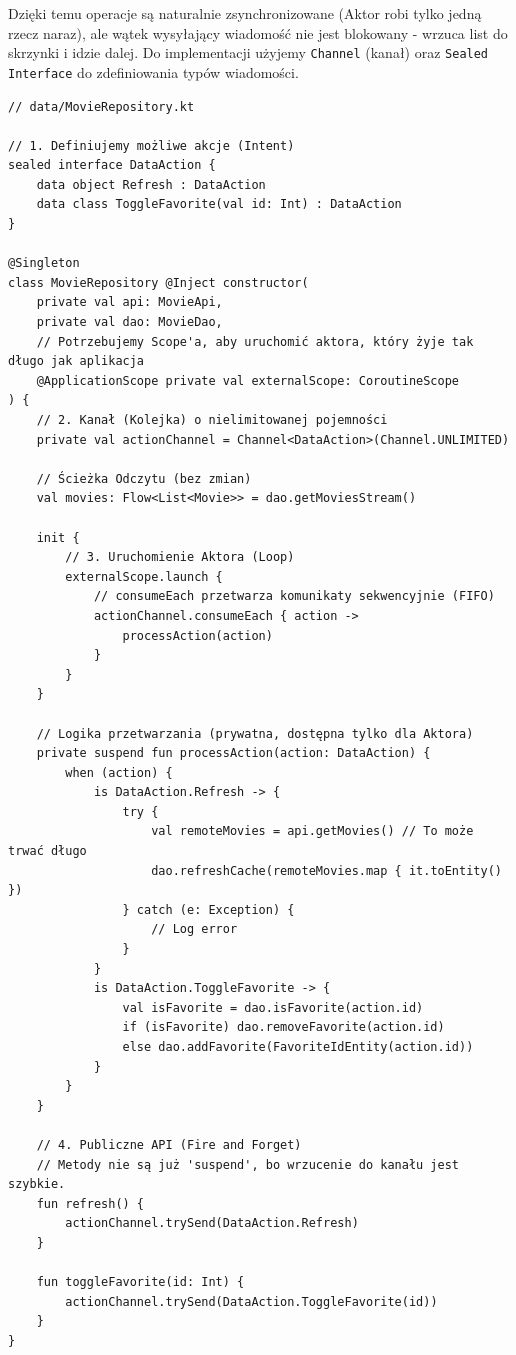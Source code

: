 Dzięki temu operacje są naturalnie zsynchronizowane (Aktor robi tylko jedną rzecz naraz), ale wątek wysyłający wiadomość nie jest blokowany - wrzuca list do skrzynki i idzie dalej. Do implementacji użyjemy \texttt{Channel} (kanał) oraz \texttt{Sealed Interface} do zdefiniowania typów wiadomości.

\begin{verbatim}
// data/MovieRepository.kt

// 1. Definiujemy możliwe akcje (Intent)
sealed interface DataAction {
    data object Refresh : DataAction
    data class ToggleFavorite(val id: Int) : DataAction
}

@Singleton
class MovieRepository @Inject constructor(
    private val api: MovieApi,
    private val dao: MovieDao,
    // Potrzebujemy Scope'a, aby uruchomić aktora, który żyje tak długo jak aplikacja
    @ApplicationScope private val externalScope: CoroutineScope
) {
    // 2. Kanał (Kolejka) o nielimitowanej pojemności
    private val actionChannel = Channel<DataAction>(Channel.UNLIMITED)

    // Ścieżka Odczytu (bez zmian)
    val movies: Flow<List<Movie>> = dao.getMoviesStream()

    init {
        // 3. Uruchomienie Aktora (Loop)
        externalScope.launch {
            // consumeEach przetwarza komunikaty sekwencyjnie (FIFO)
            actionChannel.consumeEach { action ->
                processAction(action)
            }
        }
    }

    // Logika przetwarzania (prywatna, dostępna tylko dla Aktora)
    private suspend fun processAction(action: DataAction) {
        when (action) {
            is DataAction.Refresh -> {
                try {
                    val remoteMovies = api.getMovies() // To może trwać długo
                    dao.refreshCache(remoteMovies.map { it.toEntity() })
                } catch (e: Exception) {
                    // Log error
                }
            }
            is DataAction.ToggleFavorite -> {
                val isFavorite = dao.isFavorite(action.id)
                if (isFavorite) dao.removeFavorite(action.id)
                else dao.addFavorite(FavoriteIdEntity(action.id))
            }
        }
    }

    // 4. Publiczne API (Fire and Forget)
    // Metody nie są już 'suspend', bo wrzucenie do kanału jest szybkie.
    fun refresh() {
        actionChannel.trySend(DataAction.Refresh)
    }

    fun toggleFavorite(id: Int) {
        actionChannel.trySend(DataAction.ToggleFavorite(id))
    }
}
\end{verbatim}


